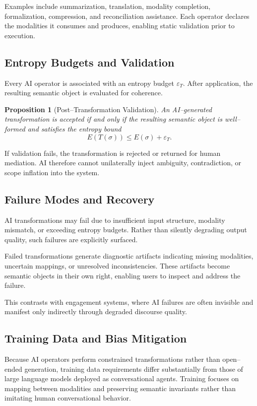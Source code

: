 \documentclass[11pt]{article}
\newtheorem{proposition}{Proposition}
\begin{document}
Examples include summarization, translation, modality completion, formalization,
compression, and reconciliation assistance. Each operator declares the modalities it
consumes and produces, enabling static validation prior to execution.

\subsection{Entropy Budgets and Validation}

Every AI operator is associated with an entropy budget $\varepsilon_T$. After application,
the resulting semantic object is evaluated for coherence.

\begin{proposition}[Post--Transformation Validation]
An AI--generated transformation is accepted if and only if the resulting semantic object
is well--formed and satisfies the entropy bound
\[
E(T(\sigma)) \le E(\sigma) + \varepsilon_T.
\]
\end{proposition}

If validation fails, the transformation is rejected or returned for human mediation. AI
therefore cannot unilaterally inject ambiguity, contradiction, or scope inflation into the
system.

\subsection{Failure Modes and Recovery}

AI transformations may fail due to insufficient input structure, modality mismatch, or
exceeding entropy budgets. Rather than silently degrading output quality, such failures are
explicitly surfaced.

Failed transformations generate diagnostic artifacts indicating missing modalities,
uncertain mappings, or unresolved inconsistencies. These artifacts become semantic objects
in their own right, enabling users to inspect and address the failure.

This contrasts with engagement systems, where AI failures are often invisible and manifest
only indirectly through degraded discourse quality.

\subsection{Training Data and Bias Mitigation}

Because AI operators perform constrained transformations rather than open--ended
generation, training data requirements differ substantially from those of large language
models deployed as conversational agents. Training focuses on mapping between modalities
and preserving semantic invariants rather than imitating human conversational behavior.
\end{document}
